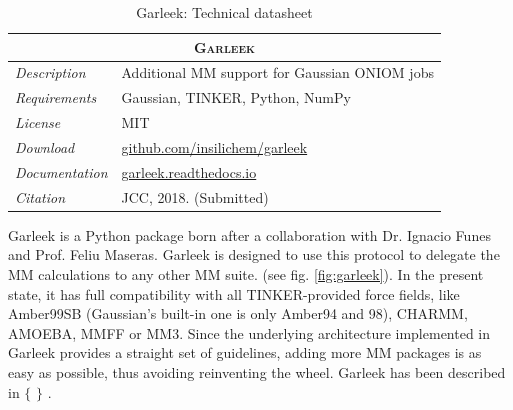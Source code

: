 \begin{table}[hbtp]
	\caption{Garleek: Technical datasheet}
	\footnotesize
	\newcommand{\tableheading}[1]{\multicolumn{2}{c}{\textsc{#1}}}
	\begin{tabularx}{\textwidth}{RL}
		\toprule
		\tableheading{Garleek}\\
		\toprule
		\textit{Description} & Additional MM support for Gaussian ONIOM jobs \\
		\midrule
		\textit{Requirements} & Gaussian, TINKER, Python, NumPy \\
		\midrule
		\textit{License} & MIT \\
		\midrule
		\textit{Download} & \href{https://github.com/insilichem/garleek}{github.com/insilichem/garleek} \\
		\midrule
		\textit{Documentation} & \href{http://garleek.readthedocs.io}{garleek.readthedocs.io} \\
		\midrule
		\textit{Citation} & JCC, 2018. (Submitted) \\
		\bottomrule

	\end{tabularx}
\end{table}

Garleek is a Python package born after a collaboration with Dr. Ignacio Funes and Prof. Feliu Maseras. Garleek is designed to use this protocol to delegate the MM calculations to any other MM suite. (see fig. \ref{fig:garleek}). In the present state, it has full compatibility with all TINKER-provided force fields, like Amber99SB (Gaussian’s built-in one is only Amber94 and 98), CHARMM, AMOEBA, MMFF or MM3. Since the underlying architecture implemented in Garleek provides a straight set of guidelines, adding more MM packages is as easy as possible, thus avoiding reinventing the wheel. Garleek has been described in $ \{ $ $ \} $ .



